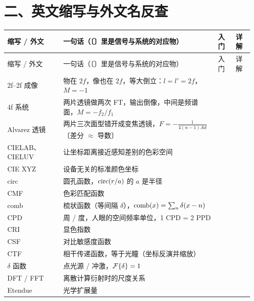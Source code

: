 \section*{二、英文缩写与外文名反查}\label{tab:abbr}
{\footnotesize\setlength{\tabcolsep}{2.5pt}\renewcommand{\arraystretch}{1.16}
\begin{longtable}{@{}P{3.45cm}P{11.75cm}>{\raggedleft\arraybackslash}p{0.72cm}>{\raggedleft\arraybackslash}p{0.72cm}@{}}
\toprule
缩写 / 外文 & 一句话（〔〕里是信号与系统的对应物）& 入门 & 详解\\ \midrule
\endfirsthead
\toprule
缩写 / 外文 & 一句话（〔〕里是信号与系统的对应物）& 入门 & 详解\\ \midrule
\endhead
\bottomrule
\endfoot
2f–2f 成像 & 物在 $2f$，像也在 $2f$，等大倒立：$l=l'=2f$，$M=-1$ & \pageref{sec:p-geom} & \pageref{sec:lensimg}\\
4f 系统 & 两片透镜做两次 FT，输出倒像，中间是频谱面，$M=-f_2/f_1$ & \pageref{sec:p-lensft} & \pageref{sec:4f}\\
Alvarez 透镜 & 两片三次面型错开成变焦透镜，$F=-\frac{1}{4(n-1)Ad}$〔差分 $\approx$ 导数〕 & \pageref{sec:p-screen} & \pageref{sec:alvarez}\\
CIELAB、CIELUV & 让坐标距离接近感知差别的色彩空间 &  & \pageref{sec:lab}\\
CIE XYZ & 设备无关的标准颜色坐标 &  & \pageref{sec:color}\\
circ & 圆孔函数，$\operatorname{circ}(r/a)$ 的 $a$ 是半径 & \pageref{sec:p-diff} & \pageref{sec:aperturepatterns}\\
CMF & 色彩匹配函数 &  & \pageref{sec:colormatch}\\
comb & 梳状函数（等间隔 $\delta$），$\operatorname{comb}(x)=\sum_n\delta(x-n)$ &  & \pageref{fml:pairs}\\
CPD & 周 / 度，人眼的空间频率单位，1 CPD = 2 PPD & \pageref{sec:p-eye} & \pageref{sec:screencpd}\\
CRI & 显色指数 &  & \pageref{sec:cctcri}\\
CSF & 对比敏感度函数 & \pageref{sec:p-eye} & \pageref{sec:mtfcsf}\\
CTF & 相干传递函数，等于光瞳（坐标反演并缩放） & \pageref{sec:p-imaging} & \pageref{sec:typeA}\\
$\delta$ 函数 & 点光源 / 冲激，$\mathcal{F}\{\delta\}=1$ & \pageref{sec:p-overview} & \pageref{fml:pairs}\\
DFT / FFT & 离散计算衍射时的尺度关系 &  & \pageref{sec:sampling}\\
Etendue & 光学扩展量 &  & \pageref{sec:etendue}\\

\end{longtable}}
